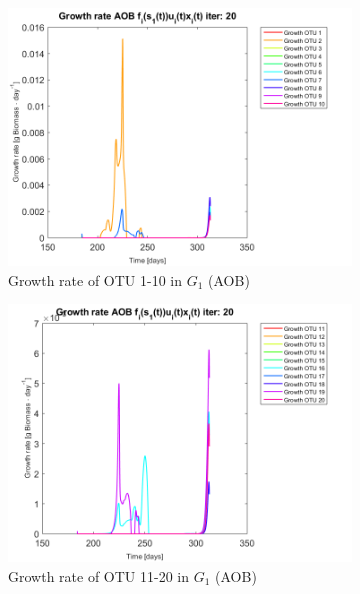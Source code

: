 \documentclass[3p,times]{article}
\begin{document}
\begin{figure}[h]
	\centering
	\begin{subfigure}{0.45 \textwidth}
		\includegraphics[width =\textwidth]{Application//200407_iter_20_growth_control_AOB_plot_1}
		\caption{Growth rate of OTU 1-10 in $G_1$ (AOB) }
	\end{subfigure}
	\begin{subfigure}{0.45 \textwidth}
		\includegraphics[width =\textwidth]{Application//200407_iter_20_growth_control_AOB_plot_2}
		\caption{Growth rate of OTU 11-20 in $G_1$ (AOB) }
	\end{subfigure}
	\begin{subfigure}{0.45 \textwidth}

\end{subfigure}
\end{figure}
\end{document}
